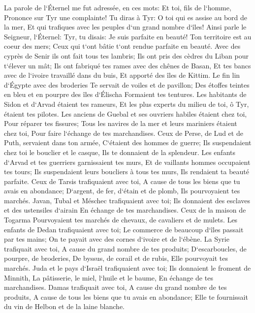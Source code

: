 \verse La parole de l`Éternel me fut adressée, en ces mots: 
\verse Et toi, fils de l`homme, Prononce sur Tyr une complainte! 
\verse Tu diras à Tyr: O toi qui es assise au bord de la mer, Et qui trafiques avec les peuples d`un grand nombre d`îles! Ainsi parle le Seigneur, l`Éternel: Tyr, tu disais: Je suis parfaite en beauté! 
\verse Ton territoire est au coeur des mers; Ceux qui t`ont bâtie t`ont rendue parfaite en beauté. 
\verse Avec des cyprès de Senir ils ont fait tous tes lambris; Ils ont pris des cèdres du Liban pour t`élever un mât; 
\verse Ils ont fabriqué tes rames avec des chênes de Basan, Et tes bancs avec de l`ivoire travaillé dans du buis, Et apporté des îles de Kittim. 
\verse Le fin lin d`Égypte avec des broderies Te servait de voiles et de pavillon; Des étoffes teintes en bleu et en pourpre des îles d`Élischa Formaient tes tentures. 
\verse Les habitants de Sidon et d`Arvad étaient tes rameurs, Et les plus experts du milieu de toi, ô Tyr, étaient tes pilotes. 
\verse Les anciens de Guebal et ses ouvriers habiles étaient chez toi, Pour réparer tes fissures; Tous les navires de la mer et leurs mariniers étaient chez toi, Pour faire l`échange de tes marchandises. 
\verse Ceux de Perse, de Lud et de Puth, servaient dans ton armée, C`étaient des hommes de guerre; Ils suspendaient chez toi le bouclier et le casque, Ils te donnaient de la splendeur. 
\verse Les enfants d`Arvad et tes guerriers garnissaient tes murs, Et de vaillants hommes occupaient tes tours; Ils suspendaient leurs boucliers à tous tes murs, Ils rendaient ta beauté parfaite. 
\verse Ceux de Tarsis trafiquaient avec toi, A cause de tous les biens que tu avais en abondance; D`argent, de fer, d`étain et de plomb, Ils pourvoyaient tes marchés. 
\verse Javan, Tubal et Méschec trafiquaient avec toi; Ils donnaient des esclaves et des ustensiles d`airain En échange de tes marchandises. 
\verse Ceux de la maison de Togarma Pourvoyaient tes marchés de chevaux, de cavaliers et de mulets. 
\verse Les enfants de Dedan trafiquaient avec toi; Le commerce de beaucoup d`îles passait par tes mains; On te payait avec des cornes d`ivoire et de l`ébène. 
\verse La Syrie trafiquait avec toi, A cause du grand nombre de tes produits; D`escarboucles, de pourpre, de broderies, De byssus, de corail et de rubis, Elle pourvoyait tes marchés. 
\verse Juda et le pays d`Israël trafiquaient avec toi; Ils donnaient le froment de Minnith, La pâtisserie, le miel, l`huile et le baume, En échange de tes marchandises. 
\verse Damas trafiquait avec toi, A cause du grand nombre de tes produits, A cause de tous les biens que tu avais en abondance; Elle te fournissait du vin de Helbon et de la laine blanche. 
